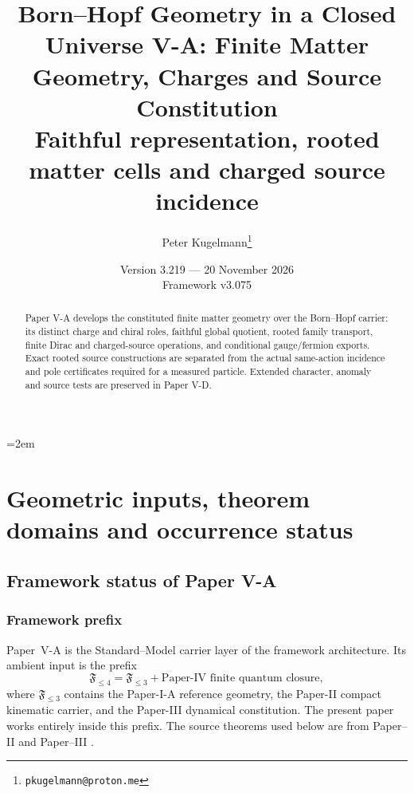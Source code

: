 \documentclass[12pt,a4paper]{article}
\title{\textbf{Born--Hopf Geometry in a Closed Universe V-A: Finite Matter Geometry, Charges and Source Constitution}\\[0.45em]
\large Faithful representation, rooted matter cells and charged source incidence}
\author{Peter Kugelmann\thanks{\texttt{pkugelmann@proton.me}}}
\date{Version 3.219 --- 20 November 2026 \\ Framework v3.075}
\begin{document}
\emergencystretch=2em
\maketitle
\begin{abstract}
Paper V-A develops the constituted finite matter geometry over the
Born--Hopf carrier: its distinct charge and chiral roles, faithful global
quotient, rooted family transport, finite Dirac and charged-source operations,
and conditional gauge/fermion exports. Exact rooted source constructions are
separated from the actual same-action incidence and pole certificates required
for a measured particle. Extended character, anomaly and source tests are
preserved in Paper V-D.
\end{abstract}
\tableofcontents
\clearpage

\section{Geometric inputs, theorem domains and occurrence status}
\label{p5a:sec:organized-scope}
\subsection{Framework status of Paper V-A}
\label{p5:sec:framework-status}

\subsubsection{Framework prefix}
Paper~V-A is the Standard--Model carrier layer of the framework architecture.  Its ambient input is the prefix
\begin{equation}
\label{p5:eq:framework-prefix}
\mathfrak F_{\le4}
=
\mathfrak F_{\le3}
+
\text{Paper-IV finite quantum closure},
\end{equation}
where \(\mathfrak F_{\le3}\) contains the Paper-I-A reference geometry, the Paper-II compact kinematic carrier, and the Paper-III dynamical constitution.  The present paper works entirely inside this prefix.
The source theorems used below are from
Paper--II \cite{Kugelmann2026b} and Paper--III \cite{Kugelmann2026c}.
\end{document}
